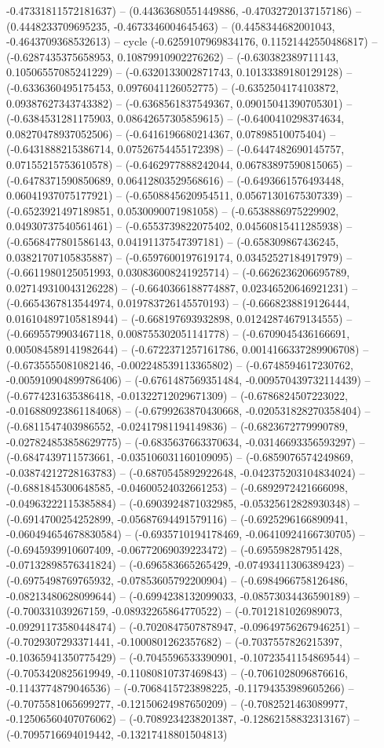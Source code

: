-0.47331811572181637) -- (0.44363680551449886, -0.47032720137157186) -- (0.4448233709695235, -0.4673346004645463) -- (0.4458344682001043, -0.4643709368532613) -- cycle
	(-0.6259107969834176, 0.11521442550486817) -- (-0.6287435375658953, 0.10879910902276262) -- (-0.630382389711143, 0.10506557085241229) -- (-0.6320133002871743, 0.10133389180129128) -- (-0.6336360495175453, 0.0976041126052775) -- (-0.6352504174103872, 0.09387627343743382) -- (-0.6368561837549367, 0.09015041390705301) -- (-0.6384531281175903, 0.08642657305859615) -- (-0.6400410298374634, 0.08270478937052506) -- (-0.6416196680214367, 0.07898510075404) -- (-0.6431888215386714, 0.07526754455172398) -- (-0.6447482690145757, 0.07155215753610578) -- (-0.6462977888242044, 0.06783897590815065) -- (-0.6478371590850689, 0.06412803529568616) -- (-0.6493661576493448, 0.06041937075177921) -- (-0.6508845620954511, 0.05671301675307339) -- (-0.6523921497189851, 0.0530090071981058) -- (-0.6538886975229902, 0.04930737540561461) -- (-0.6553739822075402, 0.04560815411285938) -- (-0.6568477801586143, 0.04191137547397181) -- (-0.658309867436245, 0.03821707105835887) -- (-0.6597600197619174, 0.03452527184917979) -- (-0.6611980125051993, 0.030836008241925714) -- (-0.6626236206695789, 0.027149310043126228) -- (-0.6640366188774887, 0.02346520646921231) -- (-0.6654367813544974, 0.019783726145570193) -- (-0.6668238819126444, 0.016104897105818944) -- (-0.668197693932898, 0.01242874679134555) -- (-0.6695579903467118, 0.008755302051141778) -- (-0.6709045436166691, 0.005084589141982644) -- (-0.6722371257161786, 0.0014166337289906708) -- (-0.6735555081082146, -0.002248539113365802) -- (-0.6748594617230762, -0.005910904899786406) -- (-0.6761487569351484, -0.009570439732114439) -- (-0.6774231635386418, -0.01322712029671309) -- (-0.6786824507223022, -0.016880923861184068) -- (-0.6799263870430668, -0.020531828270358404) -- (-0.6811547403986552, -0.02417981194149836) -- (-0.6823672779990789, -0.027824853858629775) -- (-0.6835637663370634, -0.03146693356593297) -- (-0.6847439711573661, -0.035106031160109095) -- (-0.6859076574249869, -0.03874212728163783) -- (-0.6870545892922648, -0.042375203104834024) -- (-0.6881845300648585, -0.04600524032661253) -- (-0.6892972421666098, -0.04963222115385884) -- (-0.6903924871032985, -0.05325612828930348) -- (-0.6914700254252899, -0.05687694491579116) -- (-0.6925296166890941, -0.060494654678830584) -- (-0.6935710194178469, -0.06410924166730705) -- (-0.6945939910607409, -0.06772069039223472) -- (-0.695598287951428, -0.07132898576341824) -- (-0.696583665265429, -0.07493411306389423) -- (-0.6975498769765932, -0.07853605792200904) -- (-0.6984966758126486, -0.08213480628099644) -- (-0.6994238132099033, -0.08573034436590189) -- (-0.700331039267159, -0.08932265864770522) -- (-0.7012181026989073, -0.09291173580448474) -- (-0.7020847507878947, -0.09649756267946251) -- (-0.7029307293371441, -0.1000801262357682) -- (-0.7037557826215397, -0.10365941350775429) -- (-0.7045596533390901, -0.10723541154869544) -- (-0.7053420825619949, -0.11080810737469843) -- (-0.7061028096876616, -0.1143774879046536) -- (-0.7068415723898225, -0.11794353989605266) -- (-0.7075581065699277, -0.12150624987650209) -- (-0.7082521463089977, -0.12506560407076062) -- (-0.7089234238201387, -0.12862158832313167) -- (-0.7095716694019442, -0.13217418801504813) 